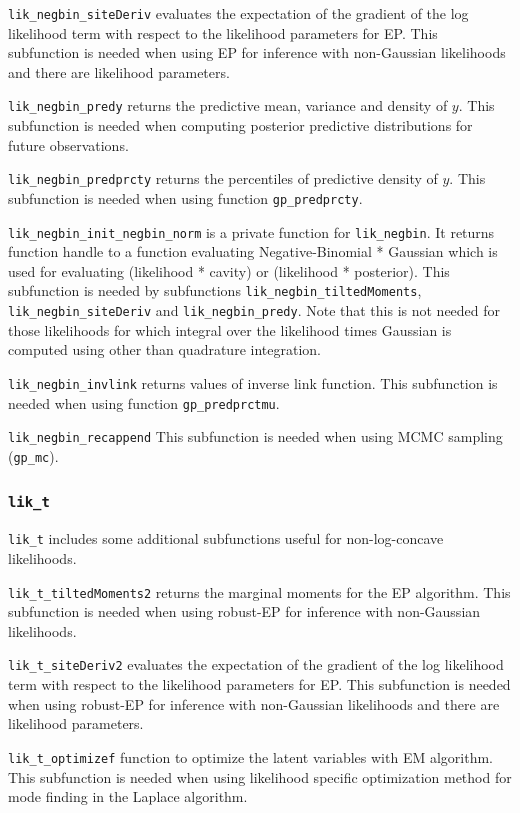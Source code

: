 \documentclass[twoside,11pt]{article}
\newcommand{\code}[1]{{\normalfont\texttt{#1}}}
\begin{document}
\code{lik\_negbin\_siteDeriv} evaluates the expectation of the
gradient of the log likelihood term with respect to the likelihood
parameters for EP. This subfunction is needed when using EP for
inference with non-Gaussian likelihoods and there are likelihood
parameters.

\code{lik\_negbin\_predy} returns the predictive mean, variance and
density of $y$. This subfunction is needed when computing posterior
predictive distributions for future observations.

\code{lik\_negbin\_predprcty} returns the percentiles of predictive
density of $y$. This subfunction is needed when using function
\code{gp\_predprcty}.

\code{lik\_negbin\_init\_negbin\_norm} is a private function for
\code{lik\_negbin}. It returns function handle to a function
evaluating Negative-Binomial * Gaussian which is used for
evaluating (likelihood * cavity) or (likelihood * posterior). This
subfunction is needed by subfunctions
\code{lik\_negbin\_tiltedMoments}, \code{lik\_negbin\_siteDeriv}
and \code{lik\_negbin\_predy}. Note that this is not needed for
those likelihoods for which integral over the likelihood times
Gaussian is computed using other than quadrature integration.

\code{lik\_negbin\_invlink} returns values of inverse link
function. This subfunction is needed when using function
\code{gp\_predprctmu}.

\code{lik\_negbin\_recappend} This subfunction is needed when using
MCMC sampling (\code{gp\_mc}).

\subsubsection{\code{lik\_t}}

\code{lik\_t} includes some additional subfunctions useful for
non-log-concave likelihoods.

\code{lik\_t\_tiltedMoments2} returns the marginal moments for the
EP algorithm. This subfunction is needed when using robust-EP for
inference with non-Gaussian likelihoods.

\code{lik\_t\_siteDeriv2} evaluates the expectation of the gradient
of the log likelihood term with respect to the likelihood
parameters for EP. This subfunction is needed when using robust-EP
for inference with non-Gaussian likelihoods and there are
likelihood parameters.

\code{lik\_t\_optimizef} function to optimize the latent variables
with EM algorithm. This subfunction is needed when using likelihood
specific optimization method for mode finding in the Laplace
algorithm.
\end{document}
